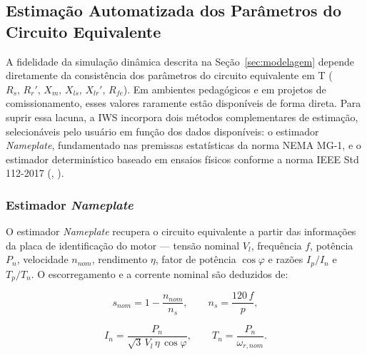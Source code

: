 

\subsection{Estimação Automatizada dos Parâmetros do Circuito Equivalente}
\label{subsec:estimacao_parametros}

A fidelidade da simulação dinâmica descrita na Seção~\ref{sec:modelagem} depende diretamente da consistência dos parâmetros do circuito equivalente em T ($R_s,\,R_r',\,X_m,\,X_{ls},\,X_{lr}',\,R_{fe}$). Em ambientes pedagógicos e em projetos de comissionamento, esses valores raramente estão disponíveis de forma direta. Para suprir essa lacuna, a IWS incorpora dois métodos complementares de estimação, selecionáveis pelo usuário em função dos dados disponíveis: o estimador \textit{Nameplate}, fundamentado nas premissas estatísticas da norma NEMA MG-1, e o estimador determinístico baseado em ensaios físicos conforme a norma IEEE Std 112-2017 (\citeauthor{ieee112_2017}, \citeyear{ieee112_2017}).

\subsubsection{Estimador \textit{Nameplate}}

O estimador \textit{Nameplate} recupera o circuito equivalente a partir das informações da placa de identificação do motor — tensão nominal $V_l$, frequência $f$, potência $P_n$, velocidade $n_{nom}$, rendimento $\eta$, fator de potência $\cos\varphi$ e razões $I_p/I_n$ e $T_p/T_n$. O escorregamento e a corrente nominal são deduzidos de:

\begin{equation}
\label{eq:nameplate_snom}
s_{nom} = 1 - \frac{n_{nom}}{n_s}, \qquad n_s = \frac{120\,f}{p},
\end{equation}

\begin{equation}
\label{eq:nameplate_in}
I_n = \frac{P_n}{\sqrt{3}\,V_l\,\eta\,\cos\varphi}, \qquad T_n = \frac{P_n}{\omega_{r,nom}}.
\end{equation}

